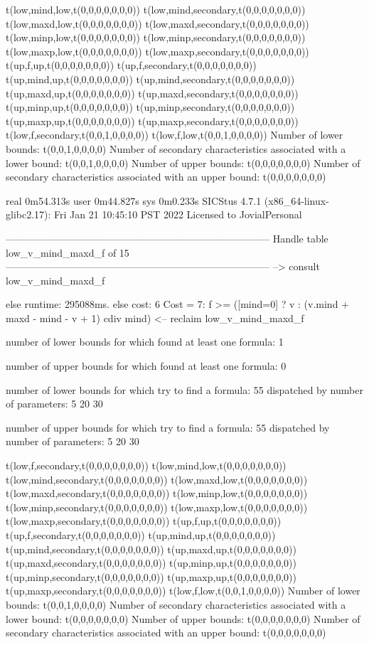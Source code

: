t(low,mind,low,t(0,0,0,0,0,0,0))
t(low,mind,secondary,t(0,0,0,0,0,0,0))
t(low,maxd,low,t(0,0,0,0,0,0,0))
t(low,maxd,secondary,t(0,0,0,0,0,0,0))
t(low,minp,low,t(0,0,0,0,0,0,0))
t(low,minp,secondary,t(0,0,0,0,0,0,0))
t(low,maxp,low,t(0,0,0,0,0,0,0))
t(low,maxp,secondary,t(0,0,0,0,0,0,0))
t(up,f,up,t(0,0,0,0,0,0,0))
t(up,f,secondary,t(0,0,0,0,0,0,0))
t(up,mind,up,t(0,0,0,0,0,0,0))
t(up,mind,secondary,t(0,0,0,0,0,0,0))
t(up,maxd,up,t(0,0,0,0,0,0,0))
t(up,maxd,secondary,t(0,0,0,0,0,0,0))
t(up,minp,up,t(0,0,0,0,0,0,0))
t(up,minp,secondary,t(0,0,0,0,0,0,0))
t(up,maxp,up,t(0,0,0,0,0,0,0))
t(up,maxp,secondary,t(0,0,0,0,0,0,0))
t(low,f,secondary,t(0,0,1,0,0,0,0))
t(low,f,low,t(0,0,1,0,0,0,0))
Number of lower bounds:                                             t(0,0,1,0,0,0,0)
Number of secondary characteristics associated with a lower bound:  t(0,0,1,0,0,0,0)
Number of upper bounds:                                             t(0,0,0,0,0,0,0)
Number of secondary characteristics associated with an upper bound: t(0,0,0,0,0,0,0)

real	0m54.313s
user	0m44.827s
sys	0m0.233s
SICStus 4.7.1 (x86_64-linux-glibc2.17): Fri Jan 21 10:45:10 PST 2022
Licensed to JovialPersonal


--------------------------------------------------------------------------------
Handle table low_v_mind_maxd_f of 15
--------------------------------------------------------------------------------
--> consult low_v_mind_maxd_f

else runtime: 295088ms. else cost: 6
Cost =  7:  f >= ([mind=0] ? v : (v.mind + maxd - mind - v + 1) cdiv mind) %
<-- reclaim low_v_mind_maxd_f

number of lower bounds for which found at least one formula: 1

number of upper bounds for which found at least one formula: 0

number of lower bounds for which try to find a formula: 55
dispatched by number of parameters: 5  20  30

number of upper bounds for which try to find a formula: 55
dispatched by number of parameters: 5  20  30

t(low,f,secondary,t(0,0,0,0,0,0,0))
t(low,mind,low,t(0,0,0,0,0,0,0))
t(low,mind,secondary,t(0,0,0,0,0,0,0))
t(low,maxd,low,t(0,0,0,0,0,0,0))
t(low,maxd,secondary,t(0,0,0,0,0,0,0))
t(low,minp,low,t(0,0,0,0,0,0,0))
t(low,minp,secondary,t(0,0,0,0,0,0,0))
t(low,maxp,low,t(0,0,0,0,0,0,0))
t(low,maxp,secondary,t(0,0,0,0,0,0,0))
t(up,f,up,t(0,0,0,0,0,0,0))
t(up,f,secondary,t(0,0,0,0,0,0,0))
t(up,mind,up,t(0,0,0,0,0,0,0))
t(up,mind,secondary,t(0,0,0,0,0,0,0))
t(up,maxd,up,t(0,0,0,0,0,0,0))
t(up,maxd,secondary,t(0,0,0,0,0,0,0))
t(up,minp,up,t(0,0,0,0,0,0,0))
t(up,minp,secondary,t(0,0,0,0,0,0,0))
t(up,maxp,up,t(0,0,0,0,0,0,0))
t(up,maxp,secondary,t(0,0,0,0,0,0,0))
t(low,f,low,t(0,0,1,0,0,0,0))
Number of lower bounds:                                             t(0,0,1,0,0,0,0)
Number of secondary characteristics associated with a lower bound:  t(0,0,0,0,0,0,0)
Number of upper bounds:                                             t(0,0,0,0,0,0,0)
Number of secondary characteristics associated with an upper bound: t(0,0,0,0,0,0,0)

